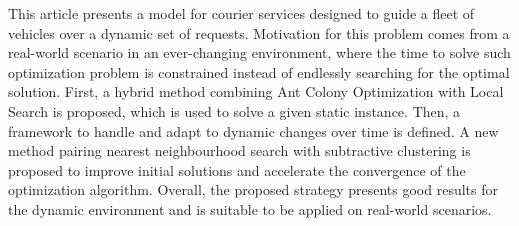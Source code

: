 
This article presents a model for courier services designed to guide a fleet of vehicles over a dynamic set of requests.
Motivation for this problem comes from a real-world scenario in an ever-changing environment, where the time to solve such optimization problem is constrained instead of  endlessly searching for the optimal solution. 
First, a hybrid method combining Ant Colony Optimization with Local Search is proposed, which is used to solve a given static instance.
Then, a framework to handle and adapt to dynamic changes over time is defined. 
A new method pairing nearest neighbourhood search with subtractive clustering is proposed to improve initial solutions and accelerate the convergence of the optimization algorithm.
Overall, the proposed strategy presents good results for the dynamic environment and is suitable to be applied on real-world scenarios.


